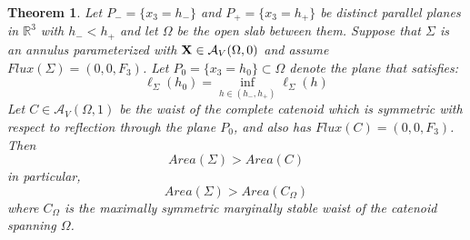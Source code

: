 \documentclass[11pt]{amsart}
\numberwithin{equation}{section}
\theoremstyle{theorem}
\newtheorem{theorem}{Theorem}[section]
\theoremstyle{definition}
\numberwithin{equation}{section}
\begin{document}
\begin{theorem} \label{thm: area(k=0) > C}
   Let $P_-=\{ x_3=h_-\}$ and $P_+=\{ x_3=h_+\}$ be distinct parallel planes in $\mathbb{R}^3$ with $h_-<h_+$ and let $\Omega$ be the open slab between them.
   Suppose that $\Sigma$ is an annulus parameterized with $\bold{X}\in \mathcal{A}_V(\Omega ,0)$  and assume $Flux(\Sigma )=(0,0,F_3)$. Let $P_0=\{ x_3=h_0\} \subset \Omega$ denote the plane that satisfies:
   $$
   \ell_{\Sigma}(h_0)=\underset{h\in (h_-,h_+)}{\inf} \ell_{\Sigma}(h)
   $$
   Let $C \in \mathcal{A}_V(\Omega ,1)$ be the waist of the complete catenoid which is symmetric with respect to reflection through the plane $P_0$, and also has $Flux(C)=(0,0,F_3)$. Then
   $$
   Area (\Sigma) > Area (C)
   $$
   in particular,
   $$
   Area (\Sigma ) > Area (C_{\Omega})
   $$
   where $C_{\Omega}$ is the maximally symmetric marginally stable waist of the catenoid spanning $\Omega$. 
\end{theorem}
\end{document}

